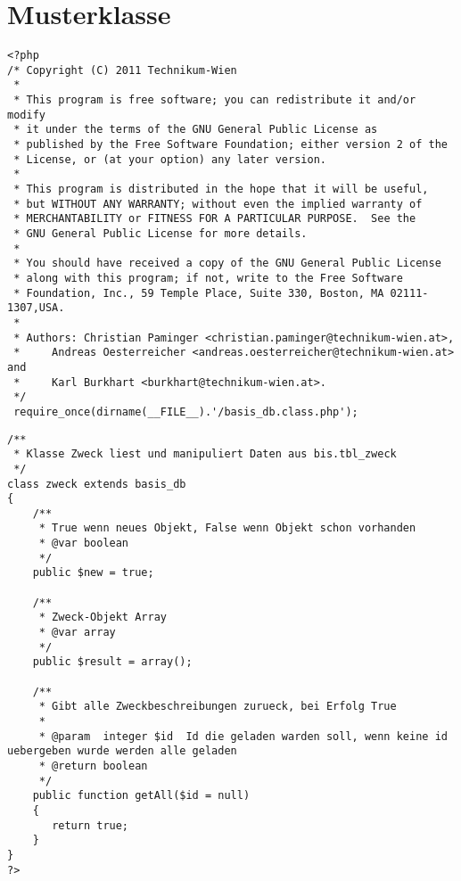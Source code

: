 \chapter{Musterklasse}
\begin{verbatim}
<?php
/* Copyright (C) 2011 Technikum-Wien
 *
 * This program is free software; you can redistribute it and/or modify
 * it under the terms of the GNU General Public License as
 * published by the Free Software Foundation; either version 2 of the
 * License, or (at your option) any later version.
 *
 * This program is distributed in the hope that it will be useful,
 * but WITHOUT ANY WARRANTY; without even the implied warranty of
 * MERCHANTABILITY or FITNESS FOR A PARTICULAR PURPOSE.  See the
 * GNU General Public License for more details.
 *
 * You should have received a copy of the GNU General Public License
 * along with this program; if not, write to the Free Software
 * Foundation, Inc., 59 Temple Place, Suite 330, Boston, MA 02111-1307,USA.
 *
 * Authors: Christian Paminger <christian.paminger@technikum-wien.at>,
 *     Andreas Oesterreicher <andreas.oesterreicher@technikum-wien.at> and
 *     Karl Burkhart <burkhart@technikum-wien.at>.
 */
 require_once(dirname(__FILE__).'/basis_db.class.php');
\end{verbatim}
\begin{verbatim}
/**
 * Klasse Zweck liest und manipuliert Daten aus bis.tbl_zweck
 */ 
class zweck extends basis_db 
{
    /**
     * True wenn neues Objekt, False wenn Objekt schon vorhanden
     * @var boolean
     */
    public $new = true;

    /**
     * Zweck-Objekt Array
     * @var array
     */
    public $result = array();

    /**
     * Gibt alle Zweckbeschreibungen zurueck, bei Erfolg True
     *
     * @param  integer $id  Id die geladen warden soll, wenn keine id uebergeben wurde werden alle geladen
     * @return boolean
     */
    public function getAll($id = null)
    {
       return true; 
    }
}
?>
\end{verbatim}

